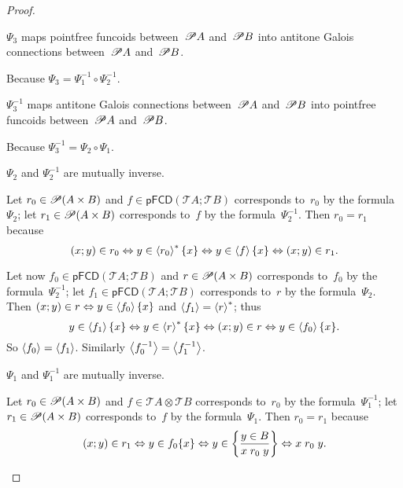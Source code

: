 \begin{proof}
\begin{claim}
$\Psi_3$ maps pointfree funcoids between~$\mathscr{P} A$ and~$\mathscr{P} B$ into antitone Galois connections between~$\mathscr{P} A$ and~$\mathscr{P} B$.
\end{claim}
\begin{claimproof}
Because $\Psi_3 = \Psi_1^{-1}\circ\Psi_2^{-1}$.
\end{claimproof}

\begin{claim}
$\Psi_3^{-1}$ maps antitone Galois connections between~$\mathscr{P} A$ and~$\mathscr{P} B$ into pointfree funcoids between~$\mathscr{P} A$ and~$\mathscr{P} B$.
\end{claim}
\begin{claimproof}
Because $\Psi_3^{-1} = \Psi_2\circ\Psi_1$.
\end{claimproof}

\begin{claim}
$\Psi_2$ and $\Psi_2^{-1}$ are mutually inverse.
\end{claim}
\begin{claimproof}
Let $r_{0}\in\mathscr{P}(A\times B)$ and $f\in\mathsf{pFCD}(\mathscr{T}A;\mathscr{T}B)$
corresponds to~$r_{0}$ by the formula~$\Psi_2$; let $r_{1}\in\mathscr{P}(A\times B)$
corresponds to~$f$ by the formula~$\Psi_2^{-1}$. Then $r_{0}=r_{1}$
because 
\[
(x;y)\in r_{0}\Leftrightarrow y\in\left\langle r_{0}\right\rangle ^{\ast}\{x\}\Leftrightarrow y\in\left\langle f\right\rangle\{x\}\Leftrightarrow(x;y)\in r_{1}.
\]

Let now $f_{0}\in\mathsf{pFCD}(\mathscr{T}A;\mathscr{T}B)$ and $r\in\mathscr{P}(A\times B)$
corresponds to~$f_{0}$ by the formula~$\Psi_2^{-1}$; let $f_{1}\in\mathsf{pFCD}(\mathscr{T}A;\mathscr{T}B)$
corresponds to~$r$ by the formula~$\Psi_2$. Then $(x;y)\in r\Leftrightarrow y\in\left\langle f_{0}\right\rangle\{x\}$
and $\left\langle f_{1}\right\rangle=\left\langle r\right\rangle ^{\ast}$; thus 
\[
y\in\left\langle f_{1}\right\rangle\{x\}\Leftrightarrow y\in\left\langle r\right\rangle ^{\ast}\{x\}\Leftrightarrow(x;y)\in r\Leftrightarrow y\in\left\langle f_{0}\right\rangle\{x\}.
\]
So $\left\langle f_{0}\right\rangle=\left\langle f_{1}\right\rangle$. Similarly $\left\langle f_{0}^{-1}\right\rangle=\left\langle f_{1}^{-1}\right\rangle$.
\end{claimproof}

\begin{claim}
$\Psi_1$ and $\Psi_1^{-1}$ are mutually inverse.
\end{claim}
\begin{claimproof}
Let $r_0\in\mathscr{P}(A\times B)$ and $f\in\mathscr{T}A\otimes\mathscr{T}B$
corresponds to~$r_{0}$ by the formula~$\Psi_1^{-1}$; let $r_{1}\in\mathscr{P}(A\times B)$
corresponds to~$f$ by the formula~$\Psi_1$. Then $r_{0}=r_{1}$ because
\[
(x;y)\in r_1 \Leftrightarrow y\in f_0\{x\} \Leftrightarrow y\in\left\{ \frac{y\in B}{x\mathrel{r_0}y}\right\} \Leftrightarrow x\mathrel{r_0}y.
\]


\end{claimproof}
\end{proof}
